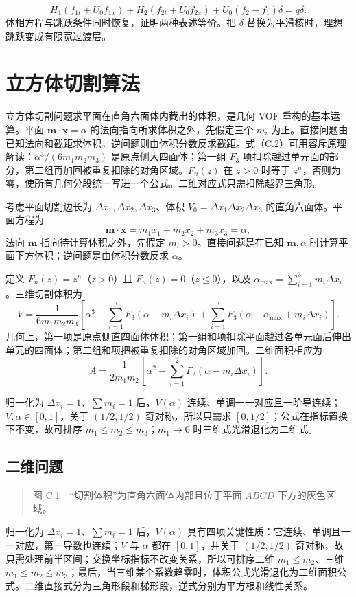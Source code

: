 \documentclass[11pt,a4paper,openany,fontset=none]{ctexbook}
\begin{document}
\begin{equation}
 H_1(f_{1t}+U_0f_{1x})+H_2(f_{2t}+U_0f_{2x})
 +U_0(f_2-f_1)\delta=q\delta. \tag{B.15}
\end{equation}
体相方程与跳跃条件同时恢复，证明两种表述等价。把 $\delta$ 替换为平滑核时，理想跳跃变成有限宽过渡层。

\chapter{立方体切割算法}
立方体切割问题求平面在直角六面体内截出的体积，是几何 VOF 重构的基本运算。平面 $\bm m\cdot\bm x=\alpha$ 的法向指向所求体积之外，先假定三个 $m_i$ 为正。直接问题由已知法向和截距求体积，逆问题则由体积分数反求截距。式（C.2）可用容斥原理解读：$\alpha^3/(6m_1m_2m_3)$ 是原点侧大四面体；第一组 $F_3$ 项扣除越过单元面的部分，第二组再加回被重复扣除的对角区域。$F_n(z)$ 在 $z>0$ 时等于 $z^n$，否则为零，使所有几何分段统一写进一个公式。二维对应式只需扣除越界三角形。


考虑平面切割边长为 $\Delta x_1,\Delta x_2,\Delta x_3$、体积 $V_0=\Delta x_1\Delta x_2\Delta x_3$ 的直角六面体。平面方程为
\begin{equation}
 \bm m\cdot\bm x=m_1x_1+m_2x_2+m_3x_3=\alpha, \tag{C.1}
\end{equation}
法向 $\bm m$ 指向待计算体积之外，先假定 $m_i>0$。直接问题是在已知 $\bm m,\alpha$ 时计算平面下方体积；逆问题是由体积分数反求 $\alpha$。

定义 $F_n(z)=z^n$（$z>0$）且 $F_n(z)=0$（$z\le0$），以及 $\alpha_{\max}=\sum_{i=1}^3m_i\Delta x_i$。三维切割体积为
\begin{equation}
 V=\frac1{6m_1m_2m_3}\left[
 \alpha^3-\sum_{i=1}^3F_3(\alpha-m_i\Delta x_i)
 +\sum_{i=1}^3F_3(\alpha-\alpha_{\max}+m_i\Delta x_i)
 \right]. \tag{C.2}
\end{equation}
几何上，第一项是原点侧直四面体体积；第一组和项扣除平面越过各单元面后伸出单元的四面体；第二组和项把被重复扣除的对角区域加回。二维面积相应为
\begin{equation}
 A=\frac1{2m_1m_2}\left[
 \alpha^2-\sum_{i=1}^2F_2(\alpha-m_i\Delta x_i)
 \right]. \tag{C.3}
\end{equation}

归一化为 $\Delta x_i=1$、$\sum m_i=1$ 后，$V(\alpha)$ 连续、单调一一对应且一阶导连续；$V,\alpha\in[0,1]$，关于 $(1/2,1/2)$ 奇对称，所以只需求 $[0,1/2]$；公式在指标置换下不变，故可排序 $m_1\le m_2\le m_3$；$m_1\to0$ 时三维式光滑退化为二维式。

\section{二维问题}
\begin{quote}\small 图 C.1　“切割体积”为直角六面体内部且位于平面 $ABCD$ 下方的灰色区域。\end{quote}
归一化为 $\Delta x_i=1$、$\sum m_i=1$ 后，$V(\alpha)$ 具有四项关键性质：它连续、单调且一一对应，第一导数也连续；$V$ 与 $\alpha$ 都在 $[0,1]$，并关于 $(1/2,1/2)$ 奇对称，故只需处理前半区间；交换坐标指标不改变关系，所以可排序二维 $m_1\le m_2$、三维 $m_1\le m_2\le m_3$；最后，当三维某个系数趋零时，体积公式光滑退化为二维面积公式。二维直接式分为三角形段和梯形段，逆式分别为平方根和线性关系。
\end{document}
